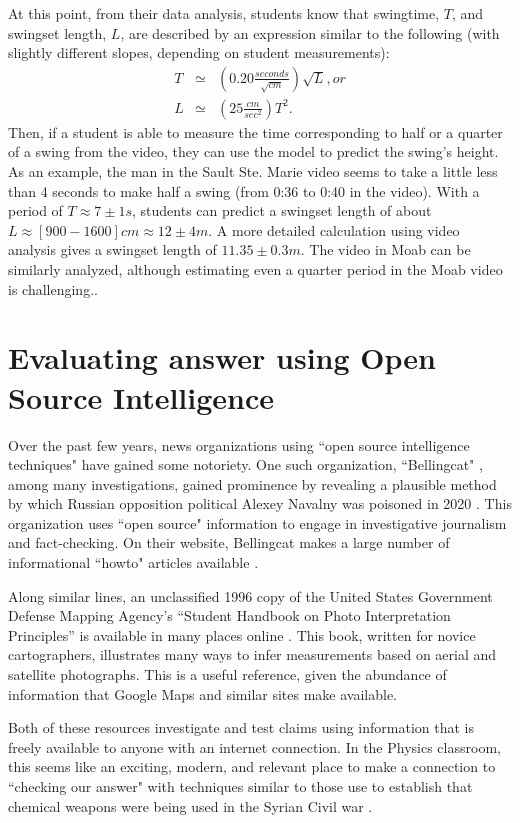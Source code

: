 \documentclass[12pt]{iopart}
\newcommand{\bea}{\begin{eqnarray}}
\newcommand{\eea}{\end{eqnarray}}
\begin{document}
At this point, from their data analysis, students know that swingtime, $T$, and swingset length, $L$, 
are described by an expression similar to the following (with slightly different slopes, depending on student measurements):
\bea
T &\simeq& \left( 0.20\frac{seconds}{\sqrt{cm}} \right) \sqrt{L}, or\\
L &\simeq& \left( 25 \frac{cm}{sec^2} \right) T^2. \label{eq_for_L}
\eea
Then, if a student is able to measure the time corresponding to half or a quarter of a swing from the video, they can use 
the model to predict the swing's height.  As an example, the man in the Sault Ste. Marie video seems to take a little less than 4 seconds 
to make half a swing (from 0:36 to 0:40 in the video).  With a period of $T \approx 7\pm1s$, students can predict 
a swingset length of about $L \approx [900-1600]cm \approx 12\pm4m$. A more detailed calculation using video analysis \cite{details} gives a swingset length of $11.35\pm0.3m$. 
The video in Moab can be similarly analyzed, although estimating even a quarter period in the Moab video is challenging..   





\section{Evaluating answer using Open Source Intelligence}
Over the past few years, news organizations using ``open source intelligence techniques" have gained some notoriety.  One such organization, ``Bellingcat" \cite{bellingcat-1},
among many investigations, gained prominence by revealing a plausible method by which Russian opposition political Alexey Navalny was poisoned in 2020 \cite{bellingcat-navalny}.
This organization uses ``open source" information to engage in investigative journalism and fact-checking.  
On their website, Bellingcat makes a large number of informational ``howto" articles available \cite{bellingcat-howto}
.

Along similar lines, an unclassified 1996 copy of the United States Government Defense Mapping Agency's 
``Student Handbook on Photo Interpretation Principles'' is available in many places online \cite{USDMA_book}.  
This book, written for novice cartographers, illustrates many ways to infer measurements 
based on aerial and satellite photographs.  
This is a useful reference, given the abundance of information that 
Google Maps and similar sites make available.

Both of these resources investigate and test claims using information that is freely available to anyone with an internet connection.  
In the Physics classroom, this seems like an exciting, modern, and relevant place to make a connection 
to ``checking our answer" with techniques similar to those use to establish that chemical weapons were being used in the Syrian Civil war \cite{bellingcat_syria}.
\end{document}
